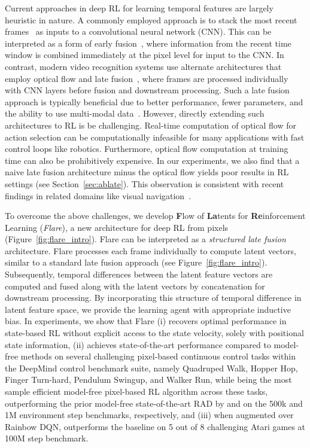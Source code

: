 \documentclass{article} \usepackage{iclr2021_conference,times}
\begin{document}
Current approaches in deep RL for learning temporal features are largely heuristic in nature. A commonly employed approach is to stack the most recent frames~\citep{mnih2015human} as inputs to a convolutional neural network (CNN). This can be interpreted as a form of early fusion~\citep{KarpathyVideo}, where information from the recent time window is combined immediately at the pixel level for input to the CNN. In contrast, modern video recognition systems use alternate architectures that employ optical flow and late fusion~\citep{simonyan2014two}, where frames are processed individually with CNN layers before fusion and downstream processing. Such a late fusion approach is typically beneficial due to better performance, fewer parameters, and the ability to use multi-modal data~\citep{ Chebotar2017PathIG, Jain-ICRA-19}. However, directly extending such architectures to RL is be challenging.
Real-time computation of optical flow for action selection can be computationally infeasible for many applications with fast control loops like robotics. Furthermore, optical flow computation at training time can also be prohibitively expensive. 
In our experiments, we also find that a naive late fusion architecture minus the optical flow yields poor results in RL settings (see Section~\ref{sec:ablate}). This observation is consistent with recent findings in related domains like visual navigation~\citep{Walsman-IROS-19}.


To overcome the above challenges, we develop {\bf F}low of {\bf La}tents for {\bf Re}inforcement Learning (\emph{Flare}), a new architecture for deep RL from pixels (Figure~\ref{fig:flare_intro}). Flare can be interpreted as a {\em structured late fusion} architecture. Flare processes each frame individually to compute latent vectors, similar to a standard late fusion approach (see Figure~\ref{fig:flare_intro}). Subsequently, temporal differences between the latent feature vectors are computed and fused along with the latent vectors by concatenation for downstream processing. By incorporating this structure of temporal difference in latent feature space, we provide the learning agent with appropriate inductive bias. In experiments, we show that Flare (i) recovers optimal performance in state-based RL without explicit access to the state velocity, solely with positional state information, (ii) achieves state-of-the-art performance compared to model-free methods on several challenging pixel-based continuous control tasks within the DeepMind control benchmark suite, namely Quadruped Walk, Hopper Hop, Finger Turn-hard, Pendulum Swingup, and Walker Run, while being the most sample efficient model-free pixel-based RL algorithm across these tasks, outperforming the prior model-free state-of-the-art RAD by  and  on the 500k and 1M environment step benchmarks, respectively, and (iii) when augmented over Rainbow DQN, outperforms the baseline on 5 out of 8 challenging Atari games at 100M step benchmark.
\end{document}
